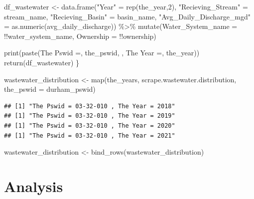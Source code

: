 \documentclass[
  12pt,
]{article}
\newenvironment{Shaded}{\begin{snugshade}}{\end{snugshade}}
\newcommand{\AttributeTok}[1]{\textcolor[rgb]{0.77,0.63,0.00}{#1}}
\newcommand{\DecValTok}[1]{\textcolor[rgb]{0.00,0.00,0.81}{#1}}
\newcommand{\FunctionTok}[1]{\textcolor[rgb]{0.00,0.00,0.00}{#1}}
\newcommand{\NormalTok}[1]{#1}
\newcommand{\OtherTok}[1]{\textcolor[rgb]{0.56,0.35,0.01}{#1}}
\newcommand{\SpecialCharTok}[1]{\textcolor[rgb]{0.00,0.00,0.00}{#1}}
\newcommand{\StringTok}[1]{\textcolor[rgb]{0.31,0.60,0.02}{#1}}
\begin{document}
\begin{Shaded}
\begin{Highlighting}[]
\NormalTok{  df\_wastewater }\OtherTok{\textless{}{-}} \FunctionTok{data.frame}\NormalTok{(}\StringTok{"Year"} \OtherTok{=} \FunctionTok{rep}\NormalTok{(the\_year,}\DecValTok{2}\NormalTok{),}
                               \StringTok{"Recieving\_Stream"} \OtherTok{=}\NormalTok{ stream\_name,}
                              \StringTok{"Recieving\_Basin"} \OtherTok{=}\NormalTok{ basin\_name,}
                               \StringTok{"Avg\_Daily\_Discharge\_mgd"} \OtherTok{=} \FunctionTok{as.numeric}\NormalTok{(avg\_daily\_discharge)) }\SpecialCharTok{\%\textgreater{}\%} 
    \FunctionTok{mutate}\NormalTok{(}\AttributeTok{Water\_System\_name =} \SpecialCharTok{!!}\NormalTok{water\_system\_name,}
         \AttributeTok{Ownership =} \SpecialCharTok{!!}\NormalTok{ownership)}
  
  \FunctionTok{print}\NormalTok{(}\FunctionTok{paste}\NormalTok{(}\StringTok{\textquotesingle{}The Pswid =\textquotesingle{}}\NormalTok{, the\_pswid, }\StringTok{\textquotesingle{}, The Year =\textquotesingle{}}\NormalTok{, the\_year))}
  \FunctionTok{return}\NormalTok{(df\_wastewater)}
\NormalTok{\}}

\NormalTok{wastewater\_distribution }\OtherTok{\textless{}{-}} \FunctionTok{map}\NormalTok{(the\_years, scrape.wastewater.distribution, }\AttributeTok{the\_pswid =}\NormalTok{ durham\_pswid)}
\end{Highlighting}
\end{Shaded}

\begin{verbatim}
## [1] "The Pswid = 03-32-010 , The Year = 2018"
## [1] "The Pswid = 03-32-010 , The Year = 2019"
## [1] "The Pswid = 03-32-010 , The Year = 2020"
## [1] "The Pswid = 03-32-010 , The Year = 2021"
\end{verbatim}

\begin{Shaded}
\begin{Highlighting}[]
\NormalTok{wastewater\_distribution }\OtherTok{\textless{}{-}} \FunctionTok{bind\_rows}\NormalTok{(wastewater\_distribution)}
\end{Highlighting}
\end{Shaded}

\newpage

\hypertarget{analysis}{%
\section{Analysis}\label{analysis}}
\end{document}
